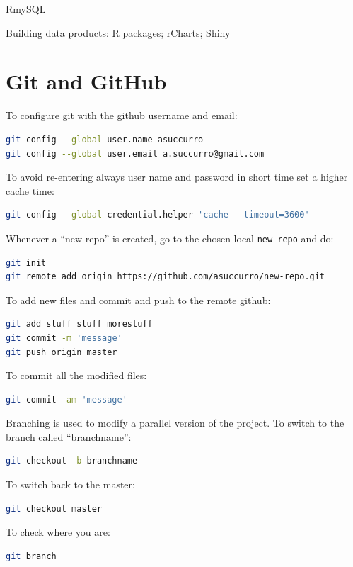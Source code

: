 RmySQL

Building data products: R packages; rCharts; Shiny


\section{Git and GitHub}

To configure git with the github username and email:
\begin{lstlisting}[language=bash]
git config --global user.name asuccurro
git config --global user.email a.succurro@gmail.com
\end{lstlisting}
To avoid re-entering always user name and password in short time set a higher cache time:
\begin{lstlisting}[language=bash]
git config --global credential.helper 'cache --timeout=3600'
\end{lstlisting}
Whenever a ``new-repo'' is created, go to the chosen local \texttt{new-repo} and do:
\begin{lstlisting}[language=bash]
git init
git remote add origin https://github.com/asuccurro/new-repo.git
\end{lstlisting}
To add new files and commit and push to the remote github:
\begin{lstlisting}[language=bash]
git add stuff stuff morestuff
git commit -m 'message'
git push origin master
\end{lstlisting}
To commit all the modified files:
\begin{lstlisting}[language=bash]
git commit -am 'message'
\end{lstlisting}
Branching is used to modify a parallel version of the project. To switch to the branch called ``branchname'':
\begin{lstlisting}[language=bash]
git checkout -b branchname
\end{lstlisting}
To switch back to the master:
\begin{lstlisting}[language=bash]
git checkout master
\end{lstlisting}
To check where you are:
\begin{lstlisting}[language=bash]
git branch
\end{lstlisting}

\begin{lstlisting}[language=bash]
\end{lstlisting}

\begin{lstlisting}[language=bash]
\end{lstlisting}

